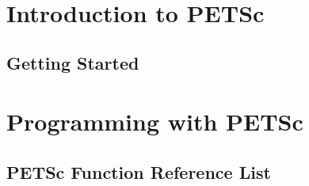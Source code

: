 

\medskip \medskip


\newpage \hbox{ } \newpage

\setcounter{page}{3}
\tableofcontents
\clearpage
{}


\part{Introduction to PETSc}
\label{part:intro}
\chapter{Getting Started}


\part{Programming with PETSc}
\label{part:usage}




\appendix

\chapter{PETSc Function Reference List}



\vfill
\eject









